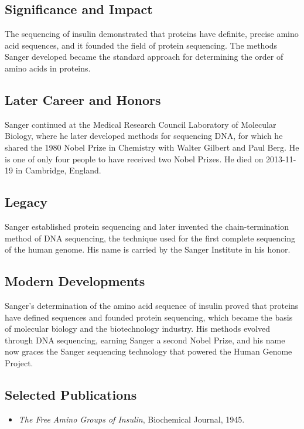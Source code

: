 \subsection*{Significance and Impact}

The sequencing of insulin demonstrated that proteins have definite, precise amino acid sequences, and it founded the field of protein sequencing. The methods Sanger developed became the standard approach for determining the order of amino acids in proteins.

\subsection*{Later Career and Honors}

Sanger continued at the Medical Research Council Laboratory of Molecular Biology, where he later developed methods for sequencing DNA, for which he shared the 1980 Nobel Prize in Chemistry with Walter Gilbert and Paul Berg. He is one of only four people to have received two Nobel Prizes. He died on 2013-11-19 in Cambridge, England.

\subsection*{Legacy}

Sanger established protein sequencing and later invented the chain-termination method of DNA sequencing, the technique used for the first complete sequencing of the human genome. His name is carried by the Sanger Institute in his honor.

\subsection*{Modern Developments}

Sanger's determination of the amino acid sequence of insulin proved that proteins have defined sequences and founded protein sequencing, which became the basis of molecular biology and the biotechnology industry. His methods evolved through DNA sequencing, earning Sanger a second Nobel Prize, and his name now graces the Sanger sequencing technology that powered the Human Genome Project.

\subsection*{Selected Publications}

\begin{itemize}

\item \emph{The Free Amino Groups of Insulin}, Biochemical Journal, 1945.

\end{itemize}

